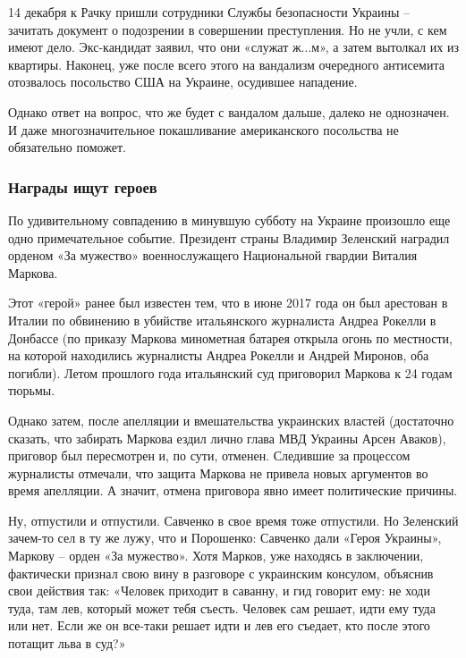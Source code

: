 14 декабря к Рачку пришли сотрудники Службы безопасности Украины – зачитать
документ о подозрении в совершении преступления. Но не учли, с кем имеют дело.
Экс-кандидат заявил, что они «служат ж...м», а затем вытолкал их из квартиры.
Наконец, уже после всего этого на вандализм очередного антисемита отозвалось
посольство США на Украине, осудившее нападение.

Однако ответ на вопрос, что же будет с вандалом дальше, далеко не однозначен. И
даже многозначительное покашливание американского посольства не обязательно
поможет.  

\subsubsection{Награды ищут героев}

По удивительному совпадению в минувшую субботу на Украине произошло еще одно
примечательное событие. Президент страны Владимир Зеленский наградил орденом
«За мужество» военнослужащего Национальной гвардии Виталия Маркова.

Этот «герой» ранее был известен тем, что в июне 2017 года он был арестован в
Италии по обвинению в убийстве итальянского журналиста Андреа Рокелли в
Донбассе (по приказу Маркова минометная батарея открыла огонь по местности, на
которой находились журналисты Андреа Рокелли и Андрей Миронов, оба погибли).
Летом прошлого года итальянский суд приговорил Маркова к 24 годам тюрьмы. 

Однако затем, после апелляции и вмешательства украинских властей (достаточно
сказать, что забирать Маркова ездил лично глава МВД Украины Арсен Аваков),
приговор был пересмотрен и, по сути, отменен. Следившие за процессом журналисты
отмечали, что защита Маркова не привела новых аргументов во время апелляции. А
значит, отмена приговора явно имеет политические причины.

Ну, отпустили и отпустили. Савченко в свое время тоже отпустили. Но Зеленский
зачем-то сел в ту же лужу, что и Порошенко: Савченко дали «Героя Украины»,
Маркову – орден «За мужество». Хотя Марков, уже находясь в заключении,
фактически признал свою вину в разговоре с украинским консулом, объяснив свои
действия так: «Человек приходит в саванну, и гид говорит ему: не ходи туда, там
лев, который может тебя съесть. Человек сам решает, идти ему туда или нет. Если
же он все-таки решает идти и лев его съедает, кто после этого потащит льва в
суд?» 


